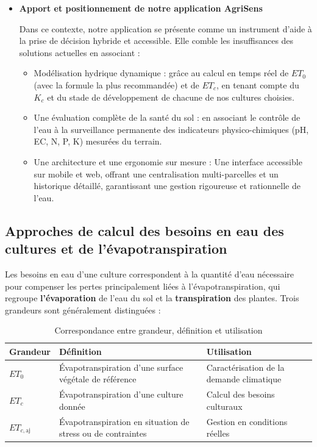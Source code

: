 \begin{itemize}[label=$\bullet$]
    \item \textbf{Apport et positionnement de notre application AgriSens}
    
    Dans ce contexte, notre application se présente comme un instrument d’aide à la prise de décision hybride et accessible. Elle comble les insuffisances des solutions actuelles en associant : 
    \begin{itemize}[label=$\circ$]
    \item Modélisation hydrique dynamique : grâce au calcul en temps réel de $ET_0$ (avec la formule la plus recommandée) et de $ET_c$, en tenant compte du $K_c$ et du stade de développement de chacune de nos cultures choisies.
    
    \item Une évaluation complète de la santé du sol : en associant le contrôle de l’eau à la surveillance permanente des indicateurs physico-chimiques (pH, EC, N, P, K) mesurées du terrain.

    \item Une architecture et une ergonomie sur mesure : Une interface accessible sur mobile et web, offrant une centralisation multi-parcelles et un historique détaillé, garantissant une gestion rigoureuse et rationnelle de l’eau.
    \end{itemize}
\end{itemize}

\subsection{Approches de calcul des besoins en eau des cultures et de l'évapotranspiration}
Les besoins en eau d’une culture correspondent à la quantité d’eau nécessaire pour compenser les pertes principalement liées à l'évapotranspiration, qui regroupe \textbf{l'évaporation} de l'eau du sol et la \textbf{transpiration} des plantes. Trois grandeurs sont généralement distinguées : 

\begin{table}[H]
    \centering
    \caption{Correspondance entre grandeur, définition et utilisation}
    \label{tab:grandeurs_et}
    \begin{tabular}{|p{2.8cm}|p{6cm}|p{5.5cm}|}
        \hline
        \textbf{Grandeur} & \textbf{Définition} & \textbf{Utilisation} \\
        \hline
        $ET_0$ & Évapotranspiration d'une surface végétale de référence & Caractérisation de la demande climatique \\
        \hline
        $ET_c$ & Évapotranspiration d'une culture donnée & Calcul des besoins culturaux \\
        \hline
        $ET_{c,\mathrm{aj}}$ & Évapotranspiration en situation de stress ou de contraintes & Gestion en conditions réelles \\
        \hline
    \end{tabular}
\end{table}

